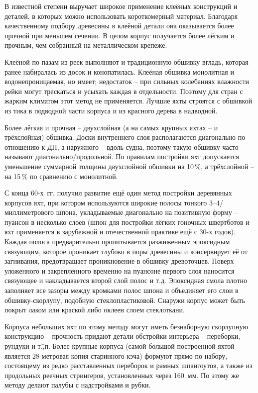 В известной степени выручает широкое применение клеёных конструкций и
деталей, в которых можно использовать короткомерный
материал. Благодаря качественному подбору древесины в клеёной детали
она оказывается более прочной при меньшем сечении. В целом корпус
получается более лёгким и прочным, чем собранный на металлическом
крепеже.

Клеёной по пазам из реек выполняют и традиционную обшивку вгладь,
которая ранее набиралась из досок и конопатилась. Клеёная обшивка
монолитная и водонепроницаемая, но имеет; недостаток \--- при сильных
колебаниях влажности рейки могут трескаться и усыхать каждая в
отдельности. Поэтому для стран с жарким климатом этот метод не
применяется. Лучшие яхты строятся с обшивкой из тика в подводной части
корпуса и из красного дерева в надводной.

Более лёгкая и прочная \--- двухслойная (а на самых крупных яхтах \---
и трёхслойная) обшивка. Доски внутреннего слоя располагаются
диагонально по отношению к ДП, а наружного \--- вдоль судна, поэтому
такую обшивку часто называют диагонально\-/продольной. По правилам
постройки яхт допускается уменьшение суммарной толщины двухслойной
обшивки на 10\,\%, а трёхслойной \--- на 15\,\% по сравнению с
монолитной.

С конца 60-х~гг. получил развитие ещё один метод постройки деревянных
корпусов яхт, при котором используются широкие полосы тонкого
3--4\-/миллиметрового шпона, укладываемые диагонально на позитивную
форму \--- пуансон в несколько слоев (шпон для постройки лёгких
гоночных швертботов и яхт применяется в зарубежной и отечественной
практике ещё с 30-х годов). Каждая полоса предварительно пропитывается
разжиженным эпоксидным связующим, которое проникает глубоко в поры
древесины и консервирует её от загнивания, предотвращает проникновение
в обшивку древоточцев. Поверх уложенного и закреплённого временно на
пуансоне первого слоя наносится связующее и накладывается второй слой
полос и т.д. Эпоксидная смола плотно заполняет все зазоры между
кромками полос шпона и объединяет его слои в обшивку-скорлупу,
подобную стеклопластиковой. Снаружи корпус может быть покрыт лаком или
краской либо оклеен слоем стеклоткани.

Корпуса небольших яхт по этому методу могут иметь безнаборную
скорлупную конструкцию \--- прочность придают детали обстройки
интерьера \--- переборки, рундуки и т.\=,п. Более крупные корпуса
(самой большой построенной яхтой является 28-метровая копия старинного
кэча) формуют прямо по набору, состоящему из редко расставленных
переборок и рамных шпангоутов, а также из продольных реечных
стрингеров, установленных через 160~мм. По этому же методу
делают палубы с надстройками и рубки.

